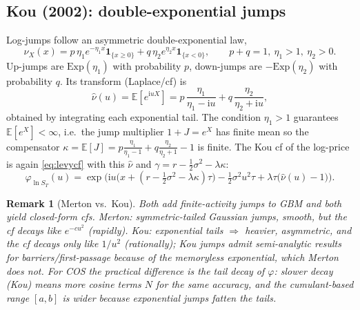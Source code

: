 \documentclass[11pt]{article}
\newcommand{\E}{\mathbb{E}}
\newcommand{\ii}{\mathrm{i}}
\newcommand{\ch}{\varphi}
\newtheorem{remark}{Remark}
\begin{document}
\subsection{Kou (2002): double-exponential jumps}
Log-jumps follow an asymmetric double-exponential law,
\[
\nu_X(x)=p\,\eta_1 e^{-\eta_1 x}\mathbf 1_{\{x\ge0\}}+q\,\eta_2 e^{\eta_2 x}\mathbf 1_{\{x<0\}},
\qquad p+q=1,\ \eta_1>1,\ \eta_2>0.
\]
Up-jumps are $\mathrm{Exp}(\eta_1)$ with probability $p$, down-jumps are $-\mathrm{Exp}(\eta_2)$ with
probability $q$. Its transform (Laplace/cf) is
\[
\widehat\nu(u)=\E[e^{\ii u X}]
=p\,\frac{\eta_1}{\eta_1-\ii u}+q\,\frac{\eta_2}{\eta_2+\ii u},
\]
obtained by integrating each exponential tail. The condition $\eta_1>1$ guarantees
$\E[e^{X}]<\infty$, i.e.\ the jump multiplier $1+J=e^X$ has finite mean so the compensator
$\kappa=\E[J]=p\frac{\eta_1}{\eta_1-1}+q\frac{\eta_2}{\eta_2+1}-1$ is finite. The Kou cf of the log-price
is again \eqref{eq:levycf} with this $\widehat\nu$ and $\gamma=r-\tfrac12\sigma^2-\lambda\kappa$:
\[
\ch_{\ln S_T}(u)=\exp\!\Big(\ii u\big(x+(r-\tfrac12\sigma^2-\lambda\kappa)\tau\big)
-\tfrac12\sigma^2u^2\tau
+\lambda\tau\big(\widehat\nu(u)-1\big)\Big).
\]

\begin{remark}[Merton vs.\ Kou]
Both add finite-activity jumps to GBM and both yield closed-form cfs. \emph{Merton}: symmetric-tailed
Gaussian jumps, smooth, but the cf decays like $e^{-c u^2}$ (rapidly). \emph{Kou}: exponential tails
$\Rightarrow$ heavier, asymmetric, and the cf decays only like $1/u^2$ (rationally); Kou jumps admit
semi-analytic results for barriers/first-passage because of the memoryless exponential, which Merton does
not. For COS the practical difference is the tail decay of $\ch$: slower decay (Kou) means more cosine
terms $N$ for the same accuracy, and the cumulant-based range $[a,b]$ is wider because exponential jumps
fatten the tails.
\end{remark}
\end{document}
